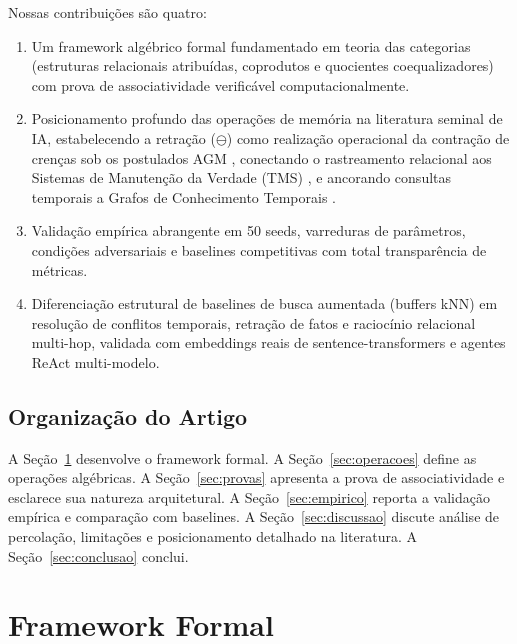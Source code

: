 \documentclass[11pt,a4paper]{article}
\theoremstyle{definition}
\begin{document}
Nossas contribui\c{c}\~oes s\~ao quatro:
\begin{enumerate}
    \item Um framework alg\'ebrico formal fundamentado em teoria das categorias (estruturas relacionais atribu\'idas, coprodutos e quocientes coequalizadores) com prova de associatividade verific\'avel computacionalmente.
    \item Posicionamento profundo das opera\c{c}\~oes de mem\'oria na literatura seminal de IA, estabelecendo a retra\c{c}\~ao ($\ominus$) como realiza\c{c}\~ao operacional da contra\c{c}\~ao de cren\c{c}as sob os postulados AGM \cite{alchourron1985logic}, conectando o rastreamento relacional aos Sistemas de Manuten\c{c}\~ao da Verdade (TMS) \cite{doyle1979truth,dekleer1986assumption}, e ancorando consultas temporais a Grafos de Conhecimento Temporais \cite{dasgupta2018hyte,leblay2018deriving,trivedi2017know}.
    \item Valida\c{c}\~ao emp\'irica abrangente em 50 seeds, varreduras de par\^ametros, condi\c{c}\~oes adversariais e baselines competitivas com total transpar\^encia de m\'etricas.
    \item Diferencia\c{c}\~ao estrutural de baselines de busca aumentada (buffers kNN) em resolu\c{c}\~ao de conflitos temporais, retra\c{c}\~ao de fatos e racioc\'inio relacional multi-hop, validada com embeddings reais de sentence-transformers e agentes ReAct multi-modelo.
\end{enumerate}

\subsection{Organiza\c{c}\~ao do Artigo}

A Se\c{c}\~ao~\ref{sec:formal} desenvolve o framework formal. A Se\c{c}\~ao~\ref{sec:operacoes} define as opera\c{c}\~oes alg\'ebricas. A Se\c{c}\~ao~\ref{sec:provas} apresenta a prova de associatividade e esclarece sua natureza arquitetural. A Se\c{c}\~ao~\ref{sec:empirico} reporta a valida\c{c}\~ao emp\'irica e compara\c{c}\~ao com baselines. A Se\c{c}\~ao~\ref{sec:discussao} discute an\'alise de percola\c{c}\~ao, limita\c{c}\~oes e posicionamento detalhado na literatura. A Se\c{c}\~ao~\ref{sec:conclusao} conclui.

\section{Framework Formal}\label{sec:formal}
\end{document}

